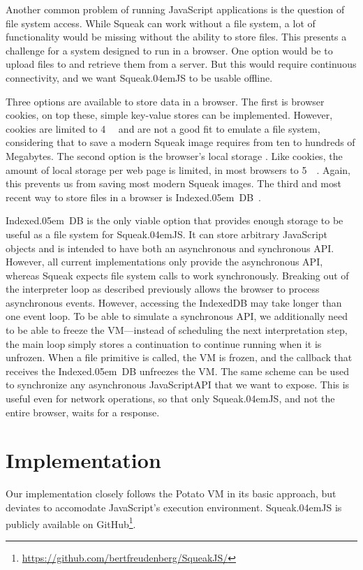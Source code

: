 \documentclass[natbib]{sigplanconf}
\newcommand*\SqueakJS{Squeak\texorpdfstring{\kern.04em}{}JS\xspace}
\newcommand*\JS{JavaScript\xspace}
\newcommand*\IndexedDB{\mbox{Indexed\kern.05em DB}\xspace}
\begin{document}
Another common problem of running \JS applications is the question of
file system access. While Squeak can work without a file system, a lot
of functionality would be missing without the ability to store
files. This presents a challenge for a system designed to run in a
browser. One option would be to upload files to and retrieve them from
a server. But this would require continuous connectivity, and we want
\SqueakJS to be usable offline.

Three options are available to store data in a browser. The first is
browser cookies, on top these, simple key-value stores can be
implemented. However, cookies are limited to \SI{4}{\kilo\byte} and
are not a good fit to emulate a file system, considering that to save
a modern Squeak image requires from ten to hundreds of Megabytes. The
second option is the browser's local storage \cite{hickson2013web}.
Like cookies, the amount of local storage per web page is limited, in
most browsers to \SI{5}{\mega\byte}. Again, this prevents us from
saving most modern Squeak images. The third and most recent way to
store files in a browser is \IndexedDB~\cite{mehta2013indexed}.

\IndexedDB is the only viable option that provides enough storage to
be useful as a file system for \SqueakJS. It can store arbitrary \JS
objects and is intended to have both an asynchronous and synchronous
\ac{API}. However, all current implementations only provide the
asynchronous \ac{API}, whereas Squeak expects file system calls to
work synchronously. Breaking out of the interpreter loop as described
previously allows the browser to process asynchronous events. However,
accessing the IndexedDB may take longer than one event loop. To be
able to simulate a synchronous API, we additionally need to be able to
freeze the \ac{VM}---instead of scheduling the next interpretation
step, the main loop simply stores a continuation to continue running
when it is unfrozen. When a file primitive is called, the \ac{VM} is
frozen, and the callback that receives the \IndexedDB unfreezes the
\ac{VM}. The same scheme can be used to synchronize any asynchronous
\JS \ac{API} that we want to expose. This is useful even for network
operations, so that only \SqueakJS, and not the entire browser, waits
for a response.

\section{Implementation}
\label{sec:impl}

Our implementation closely follows the Potato \ac{VM} in its basic
approach, but deviates to accomodate \JS's execution
environment. \SqueakJS is publicly available on
GitHub\footnote{\url{https://github.com/bertfreudenberg/SqueakJS/}}.
\end{document}
